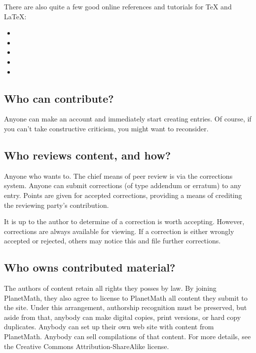 There are also quite a few good online references and tutorials for TeX and LaTeX:
\begin{itemize}
\item {}
\item {}
\item {}
\item {}
\item {}
\end{itemize}

\subsection{Who can contribute?}
Anyone can make an account and immediately start creating entries.  Of
course, if you can't take constructive criticism, you might want to
reconsider.

\subsection{Who reviews content, and how?}
Anyone who wants to. The chief means of peer review is via the corrections system. Anyone can submit corrections (of type addendum or erratum) to any entry. Points are given for accepted corrections, providing a means of crediting the reviewing party's contribution.

It is up to the author to determine of a correction is worth accepting. However, corrections are always available for viewing. If a correction is either wrongly accepted or rejected, others may notice this and file further corrections.

\subsection{Who owns contributed material?}
The authors of content retain all rights they posses by law.  By joining PlanetMath, they also agree to license to PlanetMath all content they submit to the site.  Under this arrangement, authorship recognition must be preserved, but aside from that, anybody can make digital copies, print versions, or hard copy duplicates.  Anybody can set up their own web site with content from PlanetMath.  Anybody can sell compilations of that content.  For more details, see the Creative Commons Attribution-ShareAlike license.

